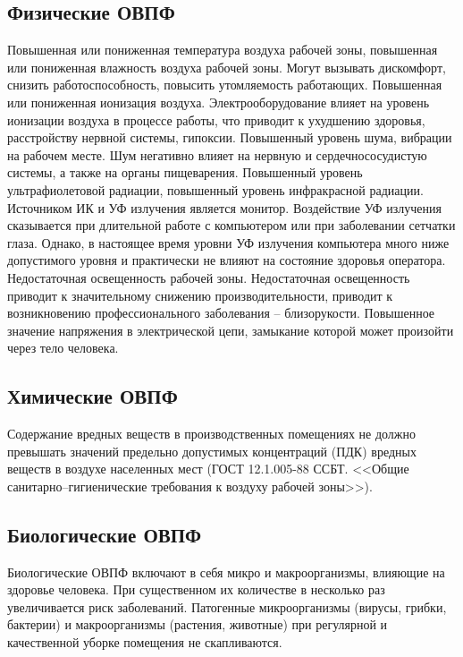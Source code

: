 \documentclass[utf8,usehyperref,12pt]{G7-32}
\begin{document}
\subsection{Физические ОВПФ}
Повышенная или пониженная температура воздуха рабочей зоны, повышенная или пониженная влажность воздуха рабочей зоны. Могут вызывать дискомфорт, снизить работоспособность, повысить утомляемость работающих.
Повышенная или пониженная ионизация воздуха. Электрооборудование влияет на уровень ионизации воздуха в процессе работы, что приводит к ухудшению здоровья, расстройству нервной системы, гипоксии.
Повышенный уровень шума, вибрации на рабочем месте.  Шум негативно влияет на нервную и сердечнососудистую системы, а также на органы пищеварения.
Повышенный уровень ультрафиолетовой радиации, повышенный уровень инфракрасной радиации. Источником ИК и УФ излучения является монитор. Воздействие УФ излучения сказывается при длительной работе с компьютером или при заболевании сетчатки глаза. Однако, в настоящее время уровни УФ излучения компьютера много ниже допустимого уровня и практически не влияют на состояние здоровья оператора.
Недостаточная освещенность рабочей зоны. Недостаточная освещенность приводит к значительному снижению производительности, приводит к возникновению профессионального заболевания – близорукости.
Повышенное значение напряжения в электрической цепи, замыкание которой может произойти через тело человека. 

\subsection{Химические ОВПФ}
Содержание вредных веществ в производственных помещениях не должно превышать значений предельно допустимых концентраций (ПДК) вредных веществ в воздухе населенных мест (ГОСТ 12.1.005-88 ССБТ. <<Общие санитарно–гигиенические требования к воздуху рабочей зоны>>\cite{gost_12.1.005-88}).

\subsection{Биологические ОВПФ}
Биологические ОВПФ включают в себя микро и макроорганизмы, влияющие на здоровье человека. При существенном их количестве в несколько раз увеличивается риск заболеваний. Патогенные микроорганизмы (вирусы, грибки, бактерии) и макроорганизмы (растения, животные) при регулярной и качественной уборке помещения не скапливаются.
\end{document}
